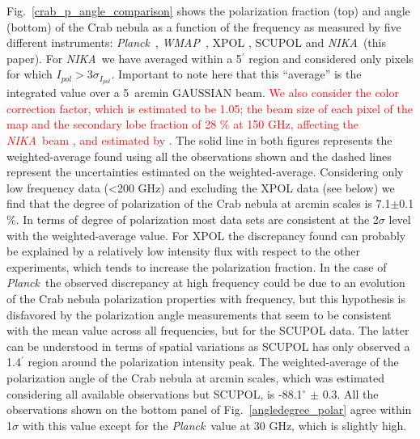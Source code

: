 \documentclass[twocolumn,traditabstract]{aa}
\def\NIKA{\textit{NIKA}}
\def\Planck{\textit{Planck}}
\def\WMAP{\textit{WMAP}}
\begin{document}
Fig.~\ref{crab_p_angle_comparison} shows the polarization fraction (top) and
angle (bottom) of the Crab nebula as a function of the frequency as measured by
five different instruments: \Planck\ \citep{2015arXiv150702058P},
\WMAP\ \citep{2011ApJS..192...19W}, XPOL \citep{aumont2010}, SCUPOL
\citep{scubapol} and \NIKA\ (this paper).  For \NIKA\ we have averaged within a
5$^\prime$ region and considered only pixels for which $I_{pol} > 3\sigma_{I_{pol}}$. Important to note here that this ``average'' is the
  integrated value over a 5~arcmin GAUSSIAN beam.
  \textcolor{red}{We also consider the color correction factor, which is estimated to be 1.05; the beam size of each pixel of the map and the secondary lobe fraction of 28 \% at 150 GHz, affecting the \NIKA\ beam \citep{catalano2014}, and estimated by \cite{adam:tel-01303736}.}
The solid line in both figures represents the weighted-average found using all
the observations shown and the dashed lines represent the uncertainties
estimated on the weighted-average. Considering only low frequency data
(\textless 200 GHz) and excluding the XPOL data (see below) we find that the
degree of polarization of the Crab nebula at arcmin scales is 7.1$\pm$0.1 \%.
In terms of degree of polarization most data sets are consistent at the
2$\sigma$ level with the weighted-average value. For XPOL the discrepancy found
can probably be explained by a relatively low intensity flux with respect to the
other experiments, which tends to increase the polarization fraction. In the
case of \Planck\, the observed discrepancy at high frequency could be due to an
evolution of the Crab nebula polarization properties with frequency, but
this hypothesis is disfavored by the polarization angle measurements that seem
to be consistent with the mean value across all frequencies, but for the SCUPOL
data. The latter can be understood in terms of spatial variations as SCUPOL has
only observed a 1.4$^\prime$ region around the polarization intensity peak. The
weighted-average of the polarization angle of the Crab nebula at arcmin scales,
which was estimated considering all available observations but SCUPOL, is -88.1$^{\circ}$
$\pm$ 0.3.  All the observations shown on the bottom panel of
Fig.~\ref{angledegree_polar} agree within 1$\sigma$ with this value except for
the \Planck\ value at 30 GHz, which is slightly high.
\end{document}
